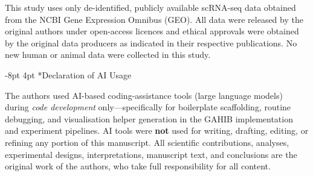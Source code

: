 \documentclass[preprint,12pt]{elsarticle}
\makeatletter
\renewcommand\section{\@startsection{section}{1}{\z@}%
  {-8pt \@plus -2pt \@minus -2pt}%
  {4pt \@plus 1pt \@minus 1pt}%
  {\normalfont\Large\bfseries}}
\makeatother
\begin{document}
This study uses only de-identified, publicly available scRNA-seq data
obtained from the NCBI Gene Expression Omnibus (GEO).
All data were released by the original authors under open-access
licences and ethical approvals were obtained by the original data
producers as indicated in their respective publications.
No new human or animal data were collected in this study.


\section*{Declaration of AI Usage}

The authors used AI-based coding-assistance tools (large language
models) during \emph{code development} only---specifically for
boilerplate scaffolding, routine debugging, and visualisation helper
generation in the GAHIB implementation and experiment pipelines.
AI tools were \textbf{not} used for writing, drafting, editing, or
refining any portion of this manuscript.
All scientific contributions, analyses, experimental designs,
interpretations, manuscript text, and conclusions are the original
work of the authors, who take full responsibility for all content.
\end{document}
